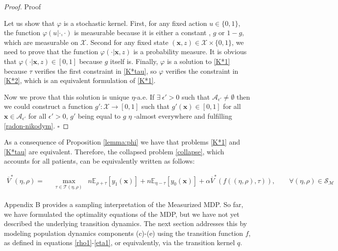 \documentclass[12pt,a4paper]{article}
\newcommand{\bx}{\mathbf{x}}
\newcommand{\mA}{\mathcal{A}}
\newcommand{\mX}{\mathcal{X}}
\newcommand{\mS}{\mathcal{S}}
\newcommand{\mT}{\mathcal{T}}
\newcommand{\mM}{\mathcal{M}}
\newcommand{\oV}{\overline{V}}
\begin{document}
\begin{proof}{Proof}
		
		Let us show that $\varphi$ is a stochastic kernel. First,  for any fixed action $u \in \{0,1\}$, the function $\varphi(u|\cdot,\cdot)$ is measurable because it is either a constant , $g$ or $1-g$, which are measurable on $\mX$. Second for any fixed state $(\bx,z) \in \mX \times \{0,1\}$, we need to prove that the function $\varphi(\cdot|\bx,z)$ is a probability measure. It is obvious that $\varphi(\cdot|\bx,z) \in [0,1]$ because $g$ itself is. Finally, $\varphi$ is a solution to \eqref{K*1} because $\tau$ verifies the first constraint in \eqref{K*tau}, so $\varphi$ verifies the constraint in \eqref{K*2}, which is an equivalent formulation of \eqref{K*1}.
		
		
		Now we prove that this solution is unique $\eta$-a.e. If $\exists \ \epsilon'>0$ such that $\mA_{\epsilon'} \neq \emptyset$ then we could construct a function $g': \mX \rightarrow [0,1]$ such that $g'(\bx)\in [0,1]$ for all $\bx \in \mA_{\epsilon'}$ for all $\epsilon' >0$, $g'$ being equal to $g$ $\eta$ -almost everywhere and fulfilling \eqref{radon-nikodym}. \hfill $\square$
	\end{proof}
	
	As a consequence of Proposition \ref{lemma:phi} we have that problems \eqref{K*1} and \eqref{K*tau} are equivalent. Therefore, the collapsed  problem \eqref{collapse}, which accounts for all patients, can be equivalently written as follows:


   
	\begin{align}
		\oV^*(\eta,\rho)=& \ \max_{\substack{\tau \in \mT(\eta,\rho)}} \ n\mathbb{E}_{\rho+\tau}\left[  y_1(\bx)\right]       +n \mathbb{E}_{\eta-\tau}\left[  y_0(\bx)\right]    + \alpha \oV^*(f((\eta,\rho),\tau)), \qquad \forall (\eta,\rho)\in \mS_\mM \label{nK*tau} \tag{nK$^*_\tau$} 
	\end{align}

Appendix B provides a sampling interpretation of the Measurized MDP. So far, we have formulated the optimality equations of the MDP, but we have not yet described the underlying transition dynamics. The next section addresses this by modeling population dynamics components (c)-(e) using the transition function $f$, as defined in equations \eqref{rho1}-\eqref{eta1}, or equivalently, via the transition kernel $q$.
\end{document}
